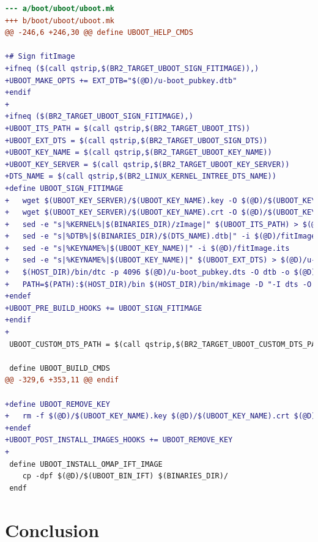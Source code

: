 \documentclass[aspectratio=169]{beamer}
\begin{document}
\begin{frame}[fragile]
\begin{lstlisting}[language=diff,basicstyle=\fontsize{5}{5}\selectfont\ttfamily\color{white}]
--- a/boot/uboot/uboot.mk
+++ b/boot/uboot/uboot.mk
@@ -246,6 +246,30 @@ define UBOOT_HELP_CMDS
 
+# Sign fitImage
+ifneq ($(call qstrip,$(BR2_TARGET_UBOOT_SIGN_FITIMAGE)),)
+UBOOT_MAKE_OPTS += EXT_DTB="$(@D)/u-boot_pubkey.dtb"
+endif
+
+ifneq ($(BR2_TARGET_UBOOT_SIGN_FITIMAGE),)
+UBOOT_ITS_PATH = $(call qstrip,$(BR2_TARGET_UBOOT_ITS))
+UBOOT_EXT_DTS = $(call qstrip,$(BR2_TARGET_UBOOT_SIGN_DTS))
+UBOOT_KEY_NAME = $(call qstrip,$(BR2_TARGET_UBOOT_KEY_NAME))
+UBOOT_KEY_SERVER = $(call qstrip,$(BR2_TARGET_UBOOT_KEY_SERVER))
+DTS_NAME = $(call qstrip,$(BR2_LINUX_KERNEL_INTREE_DTS_NAME))
+define UBOOT_SIGN_FITIMAGE
+	wget $(UBOOT_KEY_SERVER)/$(UBOOT_KEY_NAME).key -O $(@D)/$(UBOOT_KEY_NAME).key
+	wget $(UBOOT_KEY_SERVER)/$(UBOOT_KEY_NAME).crt -O $(@D)/$(UBOOT_KEY_NAME).crt
+	sed -e "s|%KERNEL%|$(BINARIES_DIR)/zImage|" $(UBOOT_ITS_PATH) > $(@D)/fitImage.its
+	sed -e "s|%DTB%|$(BINARIES_DIR)/$(DTS_NAME).dtb|" -i $(@D)/fitImage.its
+	sed -e "s|%KEYNAME%|$(UBOOT_KEY_NAME)|" -i $(@D)/fitImage.its
+	sed -e "s|%KEYNAME%|$(UBOOT_KEY_NAME)|" $(UBOOT_EXT_DTS) > $(@D)/u-boot_pubkey.dts
+	$(HOST_DIR)/bin/dtc -p 4096 $(@D)/u-boot_pubkey.dts -O dtb -o $(@D)/u-boot_pubkey.dtb
+	PATH=$(PATH):$(HOST_DIR)/bin $(HOST_DIR)/bin/mkimage -D "-I dts -O dtb -p 4096" -f $(@D)/fitImage.its -K $(@D)/u-boot_pubkey.dtb -k $(@D) -r $(BINARIES_DIR)/fitImage
+endef
+UBOOT_PRE_BUILD_HOOKS += UBOOT_SIGN_FITIMAGE
+endif
+
 UBOOT_CUSTOM_DTS_PATH = $(call qstrip,$(BR2_TARGET_UBOOT_CUSTOM_DTS_PATH))
 
 define UBOOT_BUILD_CMDS
@@ -329,6 +353,11 @@ endif
 
+define UBOOT_REMOVE_KEY
+	rm -f $(@D)/$(UBOOT_KEY_NAME).key $(@D)/$(UBOOT_KEY_NAME).crt $(@D)/$(UBOOT_KEY_NAME).pub
+endef
+UBOOT_POST_INSTALL_IMAGES_HOOKS += UBOOT_REMOVE_KEY
+
 define UBOOT_INSTALL_OMAP_IFT_IMAGE
 	cp -dpf $(@D)/$(UBOOT_BIN_IFT) $(BINARIES_DIR)/
 endf
\end{lstlisting}

\end{frame}


\section*{Conclusion}
\end{document}
